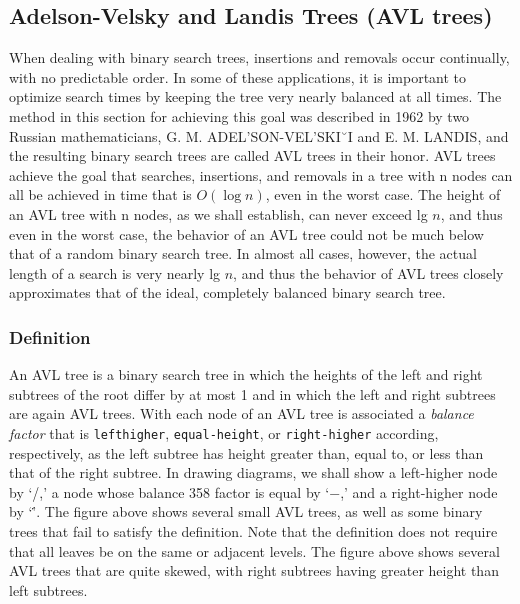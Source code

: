 \documentclass{report}
\begin{document}
    \pagebreak 
    \subsection{Adelson-Velsky and Landis Trees (AVL trees)}
    \bigbreak \noindent 
    When dealing with binary search trees, insertions and removals occur continually, with no predictable order. In some of these applications, it is important to optimize search times by keeping the tree very nearly balanced at all times. The method in this section for achieving this goal was described in 1962 by two Russian mathematicians, G. M. ADEL’SON-VEL’SKI˘I and E. M. LANDIS, and the resulting binary search trees are called AVL trees in their honor.
    \bigbreak \noindent 
    AVL trees achieve the goal that searches, insertions, and removals in a tree
with n nodes can all be achieved in time that is $O(\log n)$, even in the worst case.
The height of an AVL tree with n nodes, as we shall establish, can never exceed
lg $n$, and thus even in the worst case, the behavior of an AVL tree could not
be much below that of a random binary search tree. In almost all cases, however,
the actual length of a search is very nearly lg $n$, and thus the behavior of AVL trees
closely approximates that of the ideal, completely balanced binary search tree.
\bigbreak \noindent 
\subsubsection{Definition}
\bigbreak \noindent 
An AVL tree is a binary search tree in which the heights of the left and right
subtrees of the root differ by at most 1 and in which the left and right subtrees
are again AVL trees.
\bigbreak \noindent 
With each node of an AVL tree is associated a \textit{balance factor} that is \texttt{lefthigher}, \texttt{equal-height}, or \texttt{right-higher} according, respectively, as the left subtree
has height greater than, equal to, or less than that of the right subtree.
\bigbreak \noindent 
{}
\bigbreak \noindent 
In drawing diagrams, we shall show a left-higher node by ‘/,’ a node whose balance 358
\bigbreak \noindent 
factor is equal by ‘−,’ and a right-higher node by ‘\.’. The figure above shows several
small AVL trees, as well as some binary trees that fail to satisfy the definition.
Note that the definition does not require that all leaves be on the same or
adjacent levels. 
\bigbreak \noindent 
{}
\bigbreak \noindent 
The figure above shows several AVL trees that are quite skewed, with right subtrees having greater height than left subtrees.
\end{document}
